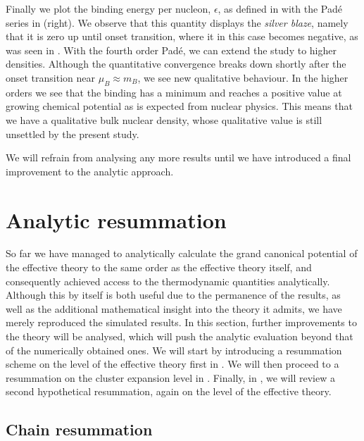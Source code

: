 Finally we plot the binding energy per nucleon, $\epsilon$, as defined
in  with the Pad\'e series in
 (right). We observe that this quantity displays the
\emph{silver blaze}, namely that it is zero up until onset transition, where it
in this case becomes negative, as was seen in \citep{Langelage:2014vpa}. With
the fourth order Pad\'e, we can extend the study to higher densities. Although
the quantitative convergence breaks down shortly after the onset transition near
$\mu_B \approx m_B$, we see new qualitative behaviour. In the higher orders we
see that the binding has a minimum and reaches a positive value at growing
chemical potential as is expected from nuclear physics. This means that we have
a qualitative bulk nuclear density, whose qualitative value is still unsettled
by the present study.

We will refrain from analysing any more results until we have introduced a final
improvement to the analytic approach.

\section{Analytic resummation} \label{sec:analytic_resummation}

So far we have managed to analytically calculate the grand canonical potential
of the effective theory to the same order as the effective theory itself, and
consequently achieved access to the thermodynamic quantities analytically.
Although this by itself is both useful due to the permanence of the results, as
well as the additional mathematical insight into the theory it admits, we have
merely reproduced the simulated results. In this section, further improvements to
the theory will be analysed, which will push the analytic evaluation beyond that
of the numerically obtained ones. We will start by introducing a resummation
scheme on the level of the effective theory first in
. We will then proceed to a resummation on the
cluster expansion level in . Finally, in
, we will review a second hypothetical
resummation, again on the level of the effective theory.

\subsection{Chain resummation} \label{sec:chain_resummation}

